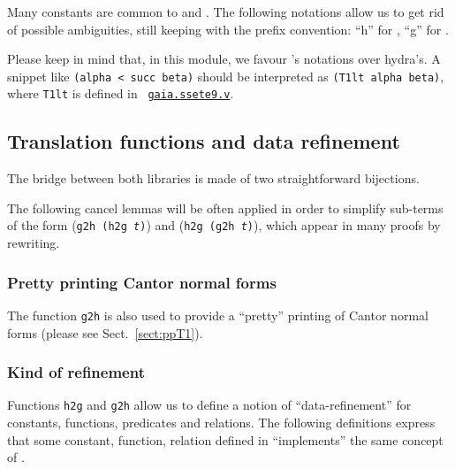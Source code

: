 
Many constants are common to \HydrasLib and \gaia. The following notations allow us to get rid of possible ambiguities, still
keeping with the prefix convention: ``h'' for \HydrasLib, ``g'' for \gaia. 


Please keep in mind that, in this module, we favour \gaia's notations over hydra's. A snippet like \texttt{(alpha < succ beta)} should be interpreted as \texttt{(T1lt alpha beta)}, where \texttt{T1lt} is defined in ~\href{https://github.com/coq-community/gaia/blob/master/theories/ssete9.v}{\texttt{gaia.ssete9.v}}.


\subsection{Translation functions and data refinement}

The bridge between both libraries is made of two straightforward bijections.



The following cancel lemmas will be often applied in order to simplify sub-terms of the form (\texttt{g2h (h2g {\it t})}) and (\texttt{h2g (g2h {\it t})}), which appear in many proofs by rewriting.



\subsubsection{Pretty printing Cantor normal forms}
\label{sect:gaia-ppT1}

The function \texttt{g2h} is also used to provide a ``pretty'' printing of Cantor normal forms (please see Sect.~\vref{sect:ppT1}).



\subsubsection{Kind of refinement}


Functions \texttt{h2g} and \texttt{g2h} allow us to define
a notion of ``data-refinement''  for constants, functions, predicates and relations. The following definitions express that some
constant, function, relation defined in \HydrasLib ``implements'' the same concept of \gaia.








